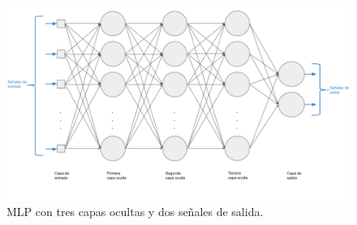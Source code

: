 \begin{onehalfspacing}



\begin{figure}[th]
	\centering
	\includegraphics[width=16cm,keepaspectratio]{XX_Figures/fig3_MLP_profunda.png}
	\caption{\footnotesize MLP con tres capas ocultas y dos señales de salida.}
	\label{fig:fig3_MLP_profunda}
\end{figure}


\end{onehalfspacing}

